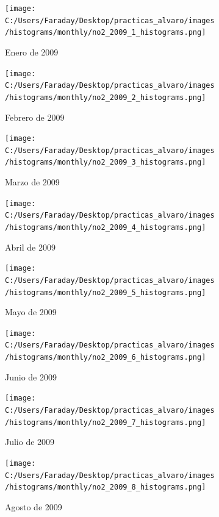 \documentclass[12pt]{article}
\begin{document}
\newpage

\begin{figure}[H]
\centering
\begin{subfigure}[h]{0.45\textwidth}
\texttt{[image: C:/Users/Faraday/Desktop/practicas\_alvaro/images/histograms/monthly/no2\_2009\_1\_histograms.png]}
\caption{Enero de 2009}
\label{fig:hist-mon-1-1-2009}
\end{subfigure}
%
\begin{subfigure}[H]{0.45\textwidth}
\texttt{[image: C:/Users/Faraday/Desktop/practicas\_alvaro/images/histograms/monthly/no2\_2009\_2\_histograms.png]}
\caption{Febrero de 2009}
\label{fig:hist-mon-1-2-2009}
\end{subfigure}
\caption{}
\end{figure}

\begin{figure}[H]
\centering
\begin{subfigure}[h]{0.45\textwidth}
\texttt{[image: C:/Users/Faraday/Desktop/practicas\_alvaro/images/histograms/monthly/no2\_2009\_3\_histograms.png]}
\caption{Marzo de 2009}
\label{fig:hist-mon-1-3-2009}
\end{subfigure}
%
\begin{subfigure}[H]{0.45\textwidth}
\texttt{[image: C:/Users/Faraday/Desktop/practicas\_alvaro/images/histograms/monthly/no2\_2009\_4\_histograms.png]}
\caption{Abril de 2009}
\label{fig:hist-mon-1-4-2009}
\end{subfigure}
\caption{}
\end{figure}

\begin{figure}[H]
\centering
\begin{subfigure}[h]{0.45\textwidth}
\texttt{[image: C:/Users/Faraday/Desktop/practicas\_alvaro/images/histograms/monthly/no2\_2009\_5\_histograms.png]}
\caption{Mayo de 2009}
\label{fig:hist-mon-1-5-2009}
\end{subfigure}
%
\begin{subfigure}[H]{0.45\textwidth}
\texttt{[image: C:/Users/Faraday/Desktop/practicas\_alvaro/images/histograms/monthly/no2\_2009\_6\_histograms.png]}
\caption{Junio de 2009}
\label{fig:hist-mon-1-6-2009}
\end{subfigure}
\caption{}
\end{figure}

\newpage

\begin{figure}[H]
\centering
\begin{subfigure}[h]{0.45\textwidth}
\texttt{[image: C:/Users/Faraday/Desktop/practicas\_alvaro/images/histograms/monthly/no2\_2009\_7\_histograms.png]}
\caption{Julio de 2009}
\label{fig:hist-mon-1-7-2009}
\end{subfigure}
%
\begin{subfigure}[H]{0.45\textwidth}
\texttt{[image: C:/Users/Faraday/Desktop/practicas\_alvaro/images/histograms/monthly/no2\_2009\_8\_histograms.png]}
\caption{Agosto de 2009}
\label{fig:hist-mon-1-8-2009}
\end{subfigure}
\caption{}
\end{figure}
\end{document}
